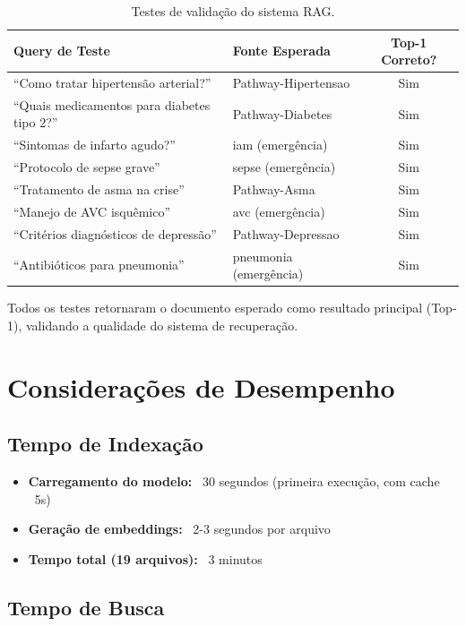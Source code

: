 \begin{table}[H]
\centering
\caption{Testes de validação do sistema RAG.}
\label{tab:validacao_rag}
\small
\begin{tabularx}{\textwidth}{X l c}
\toprule
\textbf{Query de Teste} & \textbf{Fonte Esperada} & \textbf{Top-1 Correto?} \\
\midrule
``Como tratar hipertensão arterial?'' & Pathway-Hipertensao & Sim \\
``Quais medicamentos para diabetes tipo 2?'' & Pathway-Diabetes & Sim \\
``Sintomas de infarto agudo?'' & iam (emergência) & Sim \\
``Protocolo de sepse grave'' & sepse (emergência) & Sim \\
``Tratamento de asma na crise'' & Pathway-Asma & Sim \\
``Manejo de AVC isquêmico'' & avc (emergência) & Sim \\
``Critérios diagnósticos de depressão'' & Pathway-Depressao & Sim \\
``Antibióticos para pneumonia'' & pneumonia (emergência) & Sim \\
\bottomrule
\end{tabularx}
\end{table}

Todos os testes retornaram o documento esperado como resultado principal (Top-1), validando a qualidade do sistema de recuperação.

\section{Considerações de Desempenho}

\subsection{Tempo de Indexação}

\begin{itemize}
    \item \textbf{Carregamento do modelo:} ~30 segundos (primeira execução, com cache ~5s)
    \item \textbf{Geração de embeddings:} ~2-3 segundos por arquivo
    \item \textbf{Tempo total (19 arquivos):} ~3 minutos
\end{itemize}

\subsection{Tempo de Busca}

